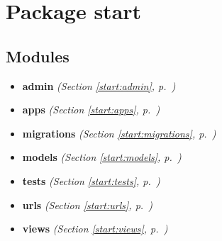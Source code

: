 %
%
%


\section{Package start}

    \label{start}


\subsection{Modules}

\begin{itemize}
\setlength{\parskip}{0ex}
\item \textbf{admin}
  \textit{(Section \ref{start:admin}, p.~\pageref{start:admin})}

\item \textbf{apps}
  \textit{(Section \ref{start:apps}, p.~\pageref{start:apps})}

\item \textbf{migrations}
  \textit{(Section \ref{start:migrations}, p.~\pageref{start:migrations})}

\item \textbf{models}
  \textit{(Section \ref{start:models}, p.~\pageref{start:models})}

\item \textbf{tests}
  \textit{(Section \ref{start:tests}, p.~\pageref{start:tests})}

\item \textbf{urls}
  \textit{(Section \ref{start:urls}, p.~\pageref{start:urls})}

\item \textbf{views}
  \textit{(Section \ref{start:views}, p.~\pageref{start:views})}

\end{itemize}


